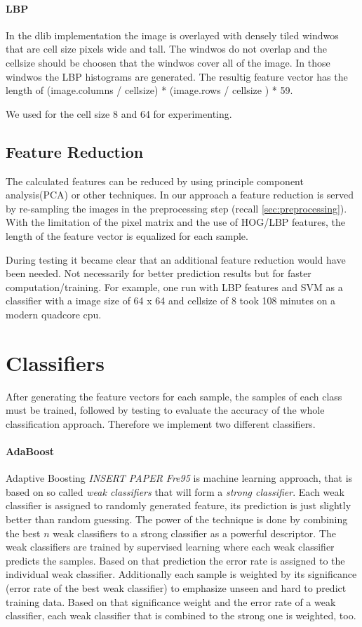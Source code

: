 \documentclass[a4paper,10pt]{article}
\begin{document}
\paragraph{LBP}
In the dlib implementation the image is overlayed with densely tiled windwos that are cell size pixels wide and tall. The windwos do not overlap and the cellsize should
be choosen that the windwos cover all of the image. In those windwos the LBP histograms are generated. 
The resultig feature vector has the length of (image.columns / cellsize)  * (image.rows / cellsize ) * 59.

We used for the cell size 8 and 64 for experimenting.

\subsection{Feature Reduction}

The calculated features can be reduced by using principle component analysis(PCA) or other techniques.
In our approach a feature reduction is served by re-sampling the images in the preprocessing step (recall \autoref{sec:preprocessing}).
With the limitation of the pixel matrix and the use of HOG/LBP features, the length of the feature vector is equalized for each sample.

During testing it became clear that an additional feature reduction would have been needed. Not necessarily for better prediction results but for faster computation/training. 
For example, one run with LBP features and SVM as a classifier with a image size of 64 x 64 and cellsize of 8 took 108 minutes on a modern quadcore cpu.

\section{Classifiers}

After generating the feature vectors for each sample, the samples of each class must be trained, followed by testing to evaluate the accuracy of the whole classification approach. 
Therefore we implement two different classifiers. 

\paragraph{AdaBoost}
Adaptive Boosting \emph{INSERT PAPER Fre95} is machine learning approach, that is based on so called \textit{weak classifiers} that will form a \textit{strong classifier}. Each weak classifier is assigned to randomly generated feature, its prediction is just slightly better than random guessing. The power of the technique is done by combining the best $n$ weak classifiers to a strong classifier as a powerful descriptor. The weak classifiers are trained by supervised learning where each weak classifier predicts the samples. Based on that prediction the error rate is assigned to the individual weak classifier. Additionally each sample is weighted by its significance (error rate of the best weak classifier) to emphasize unseen and hard to predict training data. Based on that significance weight and the error rate of a weak classifier, each weak classifier that is combined to the strong one is weighted, too.
\end{document}
